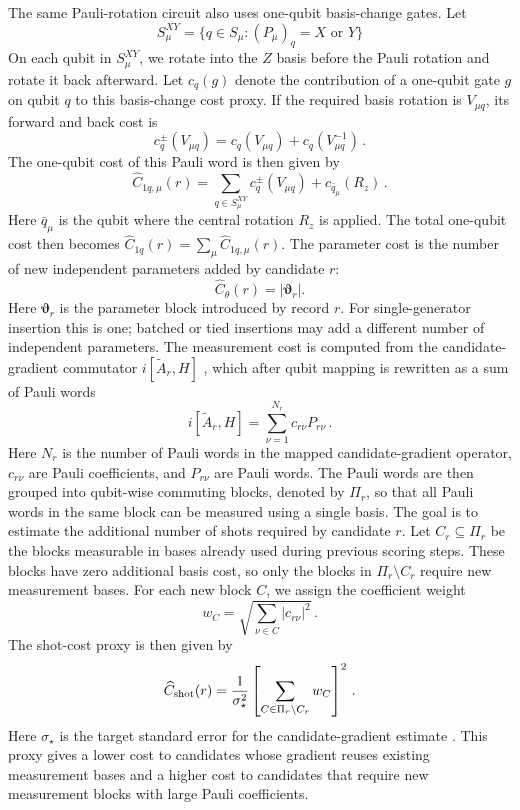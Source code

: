 \documentclass[
  reprint,
  amsmath,
  amssymb,
  aps,
  pra,
  nofootinbib,
  superscriptaddress,
  floatfix
]{revtex4-2}
\begin{document}
The same Pauli-rotation circuit also uses one-qubit basis-change gates. Let
\[
S_{\mu}^{XY} = \{q\in S_{\mu}:(P_{\mu})_q = X\text{ or }Y\}
\]
On each qubit in \(S_{\mu}^{XY}\), we rotate into the \(Z\) basis before the Pauli rotation and rotate it back afterward. Let \(c_q(g)\) denote the contribution of a one-qubit gate \(g\) on qubit \(q\) to this basis-change cost proxy. If the required basis rotation is $V_{\mu q}$, its forward and back cost is
\[
c_q^{\pm}(V_{\mu q})=c_q(V_{\mu q})+c_q(V^{-1}_{\mu q})\,.
\]
The one-qubit cost of this Pauli word is then given by
%
\begin{equation*}
\widehat{C}_{1q,\mu}(r) = \sum_{q\in S_{\mu}^{XY}}c_q^\pm(V_{\mu q}) + c_{\bar{q}_{\mu}}(R_z)\,.
\end{equation*}
Here \(\bar{q}_{\mu}\) is the qubit where the central rotation \(R_z\) is applied. The total one-qubit cost then becomes \(\widehat{C}_{1q}(r)=\sum_\mu\widehat{C}_{1q,\mu}(r)\). The parameter cost is the number of new independent parameters added by candidate \(r\):
\begin{equation*}
\widehat C_\theta(r)
=
|\boldsymbol\vartheta_r|.
\end{equation*}
%
Here \(\boldsymbol\vartheta_r\) is the parameter block introduced by record
\(r\). For single-generator insertion this is one; batched or tied insertions
may add a different number of independent parameters. The measurement cost is
computed from the candidate-gradient commutator
\(i[\widetilde A_r,H]\)
\cite{Verteletskyi2020CliqueCover,Yen2020CompatibleMeasurements}, which after
qubit mapping is rewritten as a sum of Pauli words
%
\[
i[\widetilde A_r,H]=\sum_{\nu=1}^{N_r}c_{r\nu}P_{r\nu}\,.
\]
%
Here \(N_r\) is the number of Pauli words in the mapped candidate-gradient operator, \(c_{r\nu}\) are Pauli coefficients, and \(P_{r\nu}\) are Pauli words.
The Pauli words are then grouped into qubit-wise commuting blocks, denoted by
\(\Pi_r\), so that all Pauli words in the same block can be measured using a
single basis. The goal is to estimate the additional number of shots required
by candidate \(r\). Let \(C_r\subseteq\Pi_r\) be the blocks measurable in
bases already used during previous scoring steps. These blocks have zero
additional basis cost, so only the blocks in \(\Pi_r\setminus C_r\) require
new measurement bases.
For each new block \(C\), we assign the coefficient weight
\[
w_C = \sqrt{\sum_{\nu\in C}|c_{r\nu}|^2}\,.
\]
The shot-cost proxy is then given by
\begin{equation*}
\widehat C_{\rm shot}(r)=
\frac{1}{\sigma_\star^2}
\left[
\sum_{C\in\Pi_r\setminus C_r}
w_C
\right]^2\,.
\end{equation*}
%
Here $\sigma_\star$ is the target standard error for the candidate-gradient estimate \cite{Ikhtiarudin2025ShotEfficient}. This proxy gives a lower cost to candidates whose gradient reuses existing measurement bases and a higher cost to candidates that require new measurement blocks with large Pauli coefficients.
\end{document}
